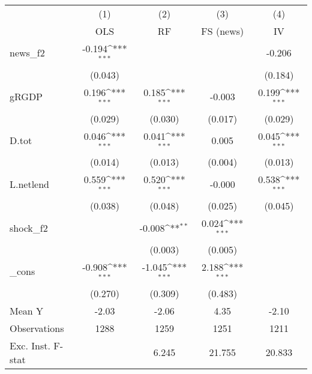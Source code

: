 {
\def\sym#1{\ifmmode^{#1}\else\(^{#1}\)\fi}
\begin{tabular}{l*{4}{c}}
\toprule
            &\multicolumn{1}{c}{(1)}&\multicolumn{1}{c}{(2)}&\multicolumn{1}{c}{(3)}&\multicolumn{1}{c}{(4)}\\
            &\multicolumn{1}{c}{OLS}&\multicolumn{1}{c}{RF}&\multicolumn{1}{c}{FS (news)}&\multicolumn{1}{c}{IV}\\
\midrule
news\_f2     &      -0.194\sym{***}&                     &                     &      -0.206         \\
            &     (0.043)         &                     &                     &     (0.184)         \\
\addlinespace
gRGDP       &       0.196\sym{***}&       0.185\sym{***}&      -0.003         &       0.199\sym{***}\\
            &     (0.029)         &     (0.030)         &     (0.017)         &     (0.029)         \\
\addlinespace
D.tot       &       0.046\sym{***}&       0.041\sym{***}&       0.005         &       0.045\sym{***}\\
            &     (0.014)         &     (0.013)         &     (0.004)         &     (0.013)         \\
\addlinespace
L.netlend   &       0.559\sym{***}&       0.520\sym{***}&      -0.000         &       0.538\sym{***}\\
            &     (0.038)         &     (0.048)         &     (0.025)         &     (0.045)         \\
\addlinespace
shock\_f2    &                     &      -0.008\sym{**} &       0.024\sym{***}&                     \\
            &                     &     (0.003)         &     (0.005)         &                     \\
\addlinespace
\_cons      &      -0.908\sym{***}&      -1.045\sym{***}&       2.188\sym{***}&                     \\
            &     (0.270)         &     (0.309)         &     (0.483)         &                     \\
\midrule
Mean Y      &       -2.03         &       -2.06         &        4.35         &       -2.10         \\
Observations&        1288         &        1259         &        1251         &        1211         \\
Exc. Inst. F-stat&                     &       6.245         &      21.755         &      20.833         \\
\bottomrule
\end{tabular}
}
